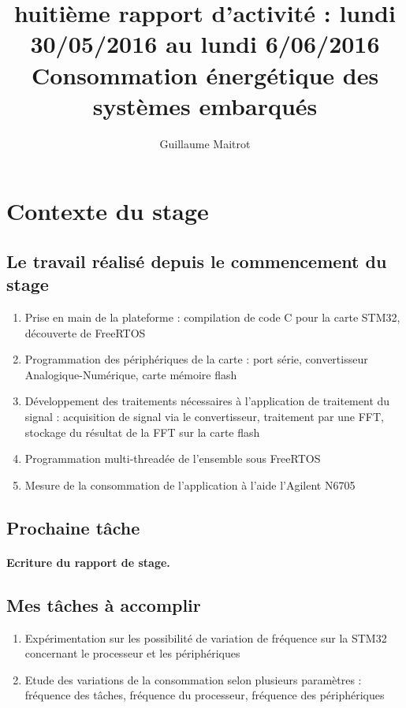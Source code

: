 \documentclass[a4paper]{article}
\title{huitième rapport d'activité : lundi 30/05/2016 au lundi 6/06/2016 }
\author{Guillaume Maitrot}
\begin{document}
\maketitle

\begin{center}
\centering
\title{Consommation énergétique des systèmes embarqués}
\end{center}

\section{Contexte du stage}

 \subsection{Le travail réalisé depuis le commencement du stage}
 \begin{enumerate}
\item {Prise en main de la plateforme : compilation de code C pour la carte STM32, découverte de FreeRTOS}
\item {Programmation des périphériques de la carte : port série,
convertisseur Analogique-Numérique, carte mémoire flash}
\item {Développement des traitements nécessaires à l'application de
traitement du signal : acquisition de signal via le convertisseur,
traitement par une FFT, stockage du résultat de la FFT sur la carte
flash}
\item { Programmation multi-threadée de l'ensemble sous FreeRTOS}
\item {Mesure de la consommation de l'application à l'aide l'Agilent
N6705}
\end{enumerate}

 \subsection{Prochaine tâche}
    \paragraph{Ecriture du rapport de stage.}
    
\subsection{Mes tâches à accomplir}
\begin{enumerate}
\item {Expérimentation sur les possibilité de variation de fréquence sur la
STM32 concernant le processeur et les périphériques}
\item {Etude des variations de la consommation selon plusieurs paramètres :
fréquence des tâches, fréquence du processeur, fréquence des
périphériques}
\end{enumerate}
\end{document}
